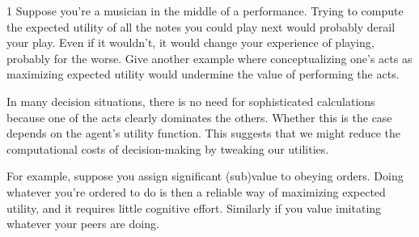 
%

\begin{exercise}{1}
  Suppose you're a musician in the middle of a performance. Trying to compute
  the expected utility of all the notes you could play next would probably
  derail your play. Even if it wouldn't, it would change your experience of
  playing, probably for the worse. Give another example where conceptualizing
  one's acts as maximizing expected utility would undermine the value of
  performing the acts.
\end{exercise}

In many decision situations, there is no need for sophisticated calculations
because one of the acts clearly dominates the others. Whether this is the case
depends on the agent's utility function. This suggests that we might reduce the
computational costs of decision-making by tweaking our utilities.

For example, suppose you assign significant (sub)value to obeying orders. Doing
whatever you're ordered to do is then a reliable way of maximizing expected
utility, and it requires little cognitive effort. Similarly if you value
imitating whatever your peers are doing.


